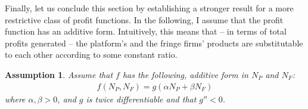 \documentclass[a4paper]{article}
\newtheorem{assumption}{Assumption}
\begin{document}
Finally, let us conclude this section by establishing a stronger result for a more restrictive class of profit functions.
In the following, I assume that the profit function has an additive form.
Intuitively, this means that -- in terms of total profits generated -- the platform's and the fringe firms' products are substitutable to each other according to some constant ratio.
\begin{assumption}
    \label{ass:additive_profit}
    Assume that $f$ has the following, additive form in $N_P$ and $N_F$:
    \begin{align*}
        f(N_P, N_F) = g(\alpha N_P + \beta N_F)
    \end{align*}
    where $\alpha, \beta > 0$, and $g$ is twice differentiable and that $g'' < 0$.
\end{assumption}
\end{document}
